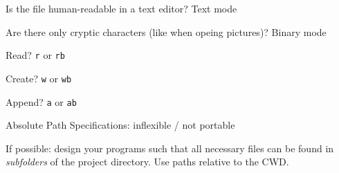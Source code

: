 \begin{frame}
%
\begin{hintbox}
\small
Is the file human-readable in a text editor?												\tabto{10.5cm} \Thus Text mode

Are there only cryptic characters (\eg like when opeing pictures)?	\tabto{10.5cm} \Thus Binary mode
\end{hintbox}
%
\begin{hintbox}
\small
Read?		\tabto{3cm} \Thus \texttt{r} or \texttt{rb}

Create?	\tabto{3cm} \Thus \texttt{w} or \texttt{wb}

Append?	\tabto{3cm} \Thus \texttt{a} or \texttt{ab}
\end{hintbox}
%
\begin{hintbox}
\small
Absolute Path Specifications: inflexible / not portable

\vspace{6pt}
If possible: design your programs such that all necessary files can be found in \emph{subfolders} of the project directory. Use paths relative to the CWD.
\end{hintbox}
%
\end{frame}


